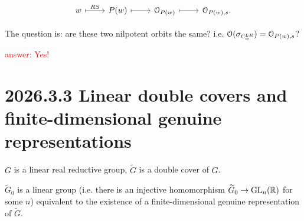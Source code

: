 \documentclass[12pt]{amsart}
\numberwithin{equation}{section}
\newcommand{\GL}{{\mathrm{GL}}} \newcommand{\SL}{{\mathrm{SL}}} \newcommand{\SU}{{\mathrm{SU}}}
\renewcommand{\tilde}{\widetilde}
\begin{document}
\[
  \begin{tikzcd}
    w \arrow[r,mapsto,"RS"] & P(w) \arrow[r,mapsto] & \CO_{P(w)} \arrow[r,mapsto] & \CO_{P(w),s}.
  \end{tikzcd}
\]

The question is: are these two nilpotent orbits the same? i.e. ${\mathcal {O}}(\sigma_{\mathcal{C}^{LR}_w}) = {\mathcal {O}}_{P(w),s}$?

\textcolor{red}{answer: Yes!} \cite{BV82}





\section{2026.3.3 Linear double covers and finite-dimensional genuine representations}

$G$ is a linear real reductive group, $\tilde{G}$ is a double cover of $G$.

\begin{thm}
  $\tilde{G}_{0}$ is a linear group (i.e. there is an injective homomorphism $\tilde{G}_0 \to \GL_n(\BR)$ for some $n$) equivalent to the existence of a finite-dimensional genuine representation of $\tilde{G}$.
\end{thm}
\end{document}
